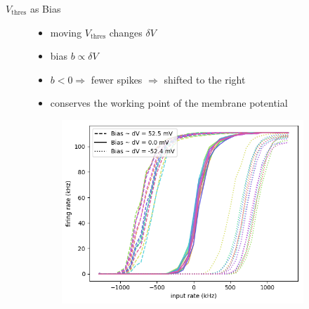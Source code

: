 \documentclass[12pt, aspectratio=169]{beamer}
\begin{document}
\begin{frame}{$V_{\text{thres}}$ as Bias}
    \begin{figure}[!htb]
            \begin{itemize}
                \item moving $V_{\text{thres}}$ changes $\delta V$
                \item bias $b \propto \delta V $\\
                \item $b < 0 \Rightarrow $ fewer spikes $\Rightarrow$ shifted to the right
                
                \item conserves the working point of the membrane potential
            \end{itemize}
      	\endminipage\hfill
            \centering
            \vspace{20pt}
            \begin{figure}
                \includegraphics[scale=0.5]{bias_for_activation_function.png}
                \label{membrane_potential}
            \end{figure}
        \endminipage\hfill
    \end{figure}
\end{frame}

\end{document}
